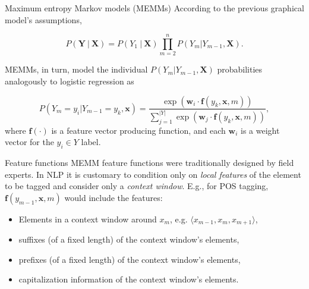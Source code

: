 \documentclass[style=upen, size=14pt]{powerdot}
\theoremstyle{definition}
\begin{document}
  \begin{slide}[toc=MEMMs]{Maximum entropy Markov models (MEMMs)}
    According to the previous graphical model's assumptions,
    \begin{small}
    $$
    P(\mathbf{Y}~|~\mathbf{X}) = P(Y_1~|~ \mathbf{X})\prod_{m=2}^n P(Y_m|Y_{m-1}, \mathbf{X}).
    $$
  \end{small}
  MEMMs, in turn, model the individual $P(Y_m|Y_{m-1}, \mathbf{X})$
  probabilities analogously to logistic regression as
    \begin{small}
    $$
    P(Y_m = y_i|Y_{m-1}=y_k,\mathbf{x})=\frac{\exp (\mathbf{w}_i \cdot \mathbf{f}(y_k,
      \mathbf{x}, m))}{\sum_{j=1}^{|Y|}\exp (\mathbf{w}_j \cdot \mathbf{f}(y_k,
      \mathbf{x}, m))},
    $$
    where $\mathbf{f}(\cdot)$ is a feature vector producing function, and each
    $\mathbf{w}_i$ is a weight vector for the $y_i\in Y$ label.
  \end{small}
  \end{slide}

  \begin{slide}[toc=Feature functions]{Feature functions}
    MEMM feature functions were traditionally designed by field experts. In NLP
    it is customary to condition only on \emph{local features} of the element to
    be tagged and consider only a \emph{context window}. E.g., for POS tagging,
    $\mathbf{f}(y_{m-1},\mathbf{x}, m)$ would include the features:
    \begin{itemize}
    \item Elements in a context window around $x_m$, e.g.
      $\langle x_{m-1}, x_{m}, x_{m+1} \rangle$,
    \item suffixes (of a fixed length) of the context window's elements,
    \item prefixes (of a fixed length) of the context window's elements,
    \item capitalization information of the context window's elements.
    \end{itemize}
    
    
  \end{slide}
\end{document}
